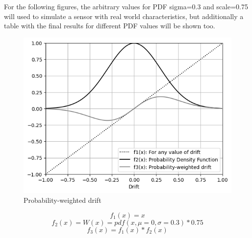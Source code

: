 \documentclass[10pt, twocolumn, a4paper]{article}
\begin{document}
            For the following figures, the arbitrary values for PDF sigma=0.3 and scale=0.75 will used to simulate a sensor with real world characteristics, but additionally a table with the final results for different PDF values will be shown too.
            \begin{figure}[H]
                \begin{center}
                    \caption{Probability-weighted drift}
                    \label{fig_rate_1a}
                    \includegraphics[width=0.8\linewidth]{multiple_ars/figure_drift_1a.png}
                \end{center}
            \end{figure}
            $$ f_1(x) = x $$
            $$ f_2(x) = W(x) = pdf(x, \mu=0, \sigma=0.3) * 0.75 $$
            $$ f_3(x) = f_1(x)*f_2(x) $$
\end{document}
